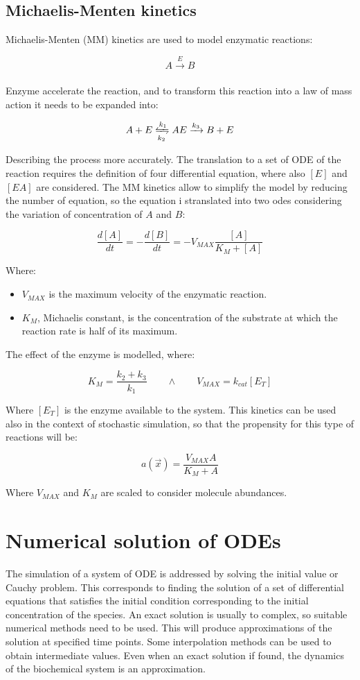   \subsection{Michaelis-Menten kinetics}
  Michaelis-Menten (MM) kinetics are used to model enzymatic reactions:

  $$A\xrightarrow[]{E} B$$

  Enzyme accelerate the reaction, and to transform this reaction into a law of mass action it needs to be expanded into:

  $$A+E\xleftrightharpoons[k_2]{k_1} AE\xrightarrow[]{k_3} B+ E$$

  Describing the process more accurately.
  The translation to a set of ODE of the reaction requires the definition of four differential equation, where also $[E]$ and $[EA]$ are considered.
  The MM kinetics allow to simplify the model by reducing the number of equation, so the equation i stranslated into two odes considering the variation of concentration of $A$ and $B$:

  $$\frac{d[A]}{dt} = -\frac{d[B]}{dt} = -V_{MAX}\frac{[A]}{K_M + [A]}$$

  Where:

  \begin{multicols}{2}
    \begin{itemize}
      \item $V_{MAX}$ is the maximum velocity of the enzymatic reaction.
      \item $K_M$, Michaelis constant, is the concentration of the substrate at which the reaction rate is half of its maximum.
    \end{itemize}
  \end{multicols}

  The effect of the enzyme is modelled, where:

  $$K_M = \frac{k_2+k_3}{k_1}\qquad\land\qquad V_{MAX} = k_{cat}[E_T]$$

  Where $[E_T]$ is the enzyme available to the system.
  This kinetics can be used also in the context of stochastic simulation, so that the propensity for this type of reactions will be:

  $$a(\vec{x}) = \frac{V_{MAX}A}{K_M+A}$$

  Where $V_{MAX}$ and $K_M$ are scaled to consider molecule abundances.

\section{Numerical solution of ODEs}
The simulation of a system of ODE is addressed by solving the initial value or Cauchy problem.
This corresponds to finding the solution of a set of differential equations that satisfies the initial condition corresponding to the initial concentration of the species.
An exact solution is usually to complex, so suitable numerical methods need to be used.
This will produce approximations of the solution at specified time points.
Some interpolation methods can be used to obtain intermediate values.
Even when an exact solution if found, the dynamics of the biochemical system is an approximation.

